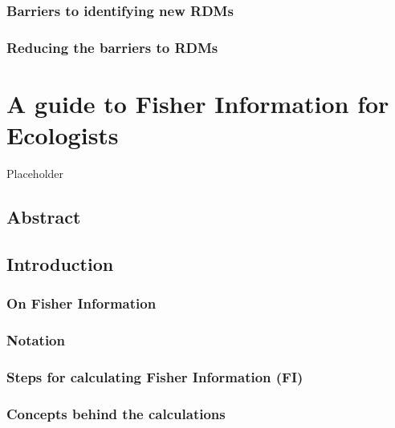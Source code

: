 \documentclass[12pt,twoside,openany]{reedthesis}
\begin{document}
\hypertarget{barriers-to-identifying-new-rdms}{%
\subsection{Barriers to identifying new RDMs}\label{barriers-to-identifying-new-rdms}}

\hypertarget{reducing-the-barriers-to-rdms}{%
\subsection{Reducing the barriers to RDMs}\label{reducing-the-barriers-to-rdms}}

\hypertarget{fiGuide}{%
\chapter{A guide to Fisher Information for Ecologists}\label{fiGuide}}

Placeholder

\hypertarget{abstract}{%
\section{Abstract}\label{abstract}}

\hypertarget{introduction-1}{%
\section{Introduction}\label{introduction-1}}

\hypertarget{on-fisher-information}{%
\subsection{On Fisher Information}\label{on-fisher-information}}

\hypertarget{notation}{%
\subsection{Notation}\label{notation}}

\hypertarget{steps-for-calculating-fisher-information-fi}{%
\subsection{Steps for calculating Fisher Information (FI)}\label{steps-for-calculating-fisher-information-fi}}

\hypertarget{concepts-behind-the-calculations}{%
\subsection{Concepts behind the calculations}\label{concepts-behind-the-calculations}}
\end{document}

